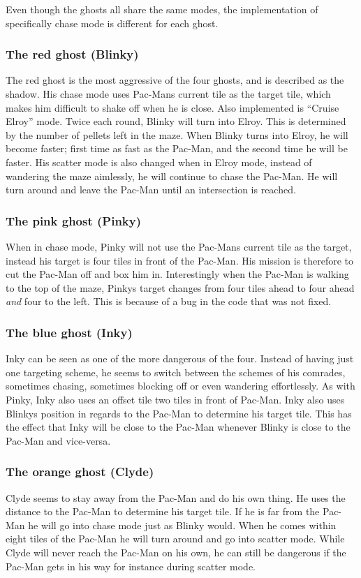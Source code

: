 Even though the ghosts all share the same modes, the implementation of specifically chase mode is different for each ghost.

\subsubsection*{The red ghost (Blinky)}
The red ghost is the most aggressive of the four ghosts, and is described as the shadow. His chase mode uses Pac-Mans current tile as the target tile, which makes him difficult to shake off when he is close. Also implemented is “Cruise Elroy” mode. Twice each round, Blinky will turn into Elroy. This is determined by the number of pellets left in the maze. When Blinky turns into Elroy, he will become faster; first time as fast as the Pac-Man, and the second time he will be faster. His scatter mode is also changed when in Elroy mode, instead of wandering the maze aimlessly, he will continue to chase the Pac-Man. He will turn around and leave the Pac-Man until an intersection is reached.

\subsubsection*{The pink ghost (Pinky)}
When in chase mode, Pinky will not use the Pac-Mans current tile as the target, instead his target is four tiles in front of the Pac-Man. His mission is therefore to cut the Pac-Man off and box him in. Interestingly when the Pac-Man is walking to the top of the maze, Pinkys target changes from four tiles ahead to four ahead \textit{and} four to the left. This is because of a bug in the code that was not fixed.

\subsubsection*{The blue ghost (Inky)}
Inky can be seen as one of the more dangerous of the four. Instead of having just one targeting scheme, he seems to switch between the schemes of his comrades, sometimes chasing, sometimes blocking off or even wandering effortlessly. As with Pinky, Inky also uses an offset tile two tiles in front of Pac-Man. Inky also uses Blinkys position in regards to the Pac-Man to determine his target tile. This has the effect that Inky will be close to the Pac-Man whenever Blinky is close to the Pac-Man and vice-versa.

\subsubsection*{The orange ghost (Clyde)}
Clyde seems to stay away from the Pac-Man and do his own thing. He uses the distance to the Pac-Man to determine his target tile. If he is far from the Pac-Man he will go into chase mode just as Blinky would. When he comes within eight tiles of the Pac-Man he will turn around and go into scatter mode. While Clyde will never reach the Pac-Man on his own, he can still be dangerous if the Pac-Man gets in his way for instance during scatter mode.

